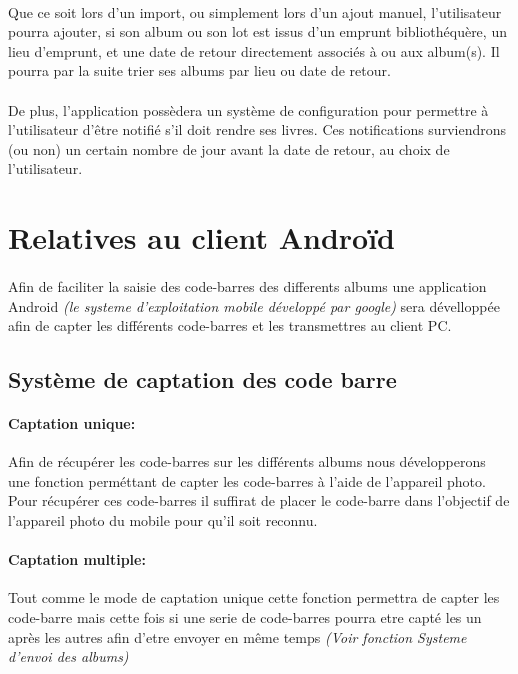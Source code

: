 \paragraph{}
Que ce soit lors d'un import, ou simplement lors d'un ajout manuel, l'utilisateur pourra ajouter, si son album ou son lot est issus d'un emprunt bibliothéquère, un lieu d'emprunt, et une date de retour directement associés à ou aux album(s). Il pourra par la suite trier ses albums par lieu ou date de retour.
\paragraph{}  
De plus, l'application possèdera un système de configuration pour permettre à l'utilisateur d'être notifié s'il doit rendre ses livres. Ces notifications surviendrons (ou non) un certain nombre de jour avant la date de retour, au choix de l'utilisateur.



\section{Relatives au client Androïd} 


\paragraph{}
Afin de faciliter la saisie des code-barres des differents albums une application Android \textit{(le systeme d'exploitation mobile développé par google)} sera dévelloppée afin de capter les différents code-barres et les transmettres au client PC.

\subsection{Système de captation des code barre}
\paragraph{Captation unique:}
Afin de récupérer les code-barres sur les différents albums nous développerons une fonction perméttant de capter les code-barres à l'aide de l'appareil photo.
Pour récupérer ces code-barres il suffirat de placer le code-barre dans l'objectif de l'appareil photo du mobile pour qu'il soit reconnu.

\paragraph{Captation multiple:}
Tout comme le mode de captation unique cette fonction permettra de capter les code-barre mais cette fois si une serie de code-barres pourra etre capté les un après les autres afin d'etre envoyer en même temps \textit{(Voir fonction Systeme d'envoi des albums)}

